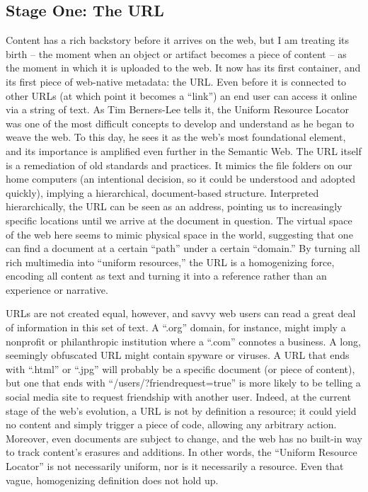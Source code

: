 \subsection{Stage One: The URL}

Content has a rich backstory before it arrives on the web, but I am treating its birth – the moment when an object or artifact becomes a piece of content – as the moment in which it is uploaded to the web. It now has its first container, and its first piece of web-native metadata: the URL. Even before it is connected to other URLs (at which point it becomes a “link”) an end user can access it online via a string of text. As Tim Berners-Lee tells it, the Uniform Resource Locator was one of the most difficult concepts to develop and understand as he began to weave the web.  To this day, he sees it as the web’s most foundational element, and its importance is amplified even further in the Semantic Web. The URL itself is a remediation of old standards and practices. It mimics the file folders on our home computers (an intentional decision, so it could be understood and adopted quickly), implying a hierarchical, document-based structure. Interpreted hierarchically, the URL can be seen as an address, pointing us to increasingly specific locations until we arrive at the document in question. The virtual space of the web here seems to mimic physical space in the world, suggesting that one can find a document at a certain “path” under a certain “domain.” By turning all rich multimedia into “uniform resources,” the URL is a homogenizing force, encoding all content as text and turning it into a reference rather than an experience or narrative.

URLs are not created equal, however, and savvy web users can read a great deal of information in this set of text. A “.org” domain, for instance, might imply a nonprofit or philanthropic institution where a “.com” connotes a business. A long, seemingly obfuscated URL might contain spyware or viruses. A URL that ends with “.html” or “.jpg” will probably be a specific document (or piece of content), but one that ends with “/users/?friendrequest=true” is more likely to be telling a social media site to request friendship with another user. Indeed, at the current stage of the web’s evolution, a URL is not by definition a resource; it could yield no content and simply trigger a piece of code, allowing any arbitrary action. Moreover, even documents are subject to change, and the web has no built-in way to track content’s erasures and additions. In other words, the “Uniform Resource Locator” is not necessarily uniform, nor is it necessarily a resource. Even that vague, homogenizing definition does not hold up.

